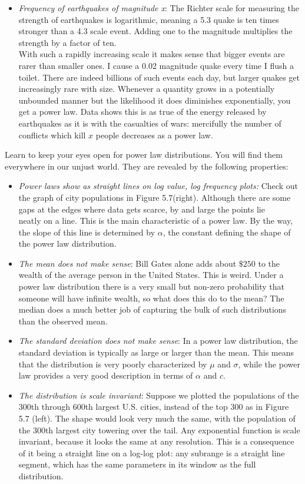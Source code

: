 \documentclass[10pt]{article}
\begin{document}
\begin{itemize}
  \item \emph{Frequency of earthquakes of magnitude x}: The Richter scale for measuring the strength of earthquakes is logarithmic, meaning a 5.3 quake is ten times stronger than a 4.3 scale event. Adding one to the magnitude multiplies the strength by a factor of ten.\\
With such a rapidly increasing scale it makes sense that bigger events are rarer than smaller ones. I cause a 0.02 magnitude quake every time I flush a toilet. There are indeed billions of such events each day, but larger quakes get increasingly rare with size. Whenever a quantity grows in a potentially unbounded manner but the likelihood it does diminishes exponentially, you get a power law. Data shows this is as true of the energy released by earthquakes as it is with the casualties of wars: mercifully the number of conflicts which kill $x$ people decreases as a power law.
\end{itemize}

Learn to keep your eyes open for power law distributions. You will find them everywhere in our unjust world. They are revealed by the following properties:

\begin{itemize}
  \item \emph{Power laws show as straight lines on log value, log frequency plots:} Check out the graph of city populations in Figure 5.7(right). Although there are some gaps at the edges where data gets scarce, by and large the points lie\\
neatly on a line. This is the main characteristic of a power law. By the way, the slope of this line is determined by $\alpha$, the constant defining the shape of the power law distribution.
  \item \emph{The mean does not make sense}: Bill Gates alone adds about $\$ 250$ to the wealth of the average person in the United States. This is weird. Under a power law distribution there is a very small but non-zero probability that someone will have infinite wealth, so what does this do to the mean? The median does a much better job of capturing the bulk of such distributions than the observed mean.
  \item \emph{The standard deviation does not make sense}: In a power law distribution, the standard deviation is typically as large or larger than the mean. This means that the distribution is very poorly characterized by $\mu$ and $\sigma$, while the power law provides a very good description in terms of $\alpha$ and $c$.
  \item \emph{The distribution is scale invariant}: Suppose we plotted the populations of the 300th through 600th largest U.S. cities, instead of the top 300 as in Figure 5.7 (left). The shape would look very much the same, with the population of the 300th largest city towering over the tail. Any exponential function is scale invariant, because it looks the same at any resolution. This is a consequence of it being a straight line on a log-log plot: any subrange is a straight line segment, which has the same parameters in its window as the full distribution.
\end{itemize}
\end{document}
